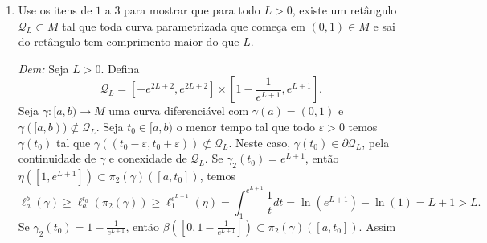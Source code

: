 \documentclass[twoside,openright,titlepage,numbers=noenddot,headinclude,  lineheaders footinclude=true,cleardoublepage=empty,BCOR=5mm,paper=a4,fontsize=12pt ]{scrbook}
\newcommand{\oo}{_}
\begin{document}
\begin{enumerate}
    
    \item Use os itens de $1$ a $3$ para mostrar que para todo $L>0$, existe um retângulo $\mathcal{Q}_L \subset M$ tal que toda curva parametrizada que começa em $(0,1) \in M$ e sai do retângulo tem comprimento maior do que $L$.    
    
    \noindent\textit{Dem:} Seja $L>0$. Defina
    \[
        \mathcal{Q} \oo L  = \left[-e^{2L+2}, e^{2L+2}\right]
        \times \left[1 - \dfrac{1}{e^{L+1}}, e^{L+1} \right].
    \]
    Seja $\gamma : [a,b) \rightarrow M$ uma curva diferenciável com $\gamma (a) = (0,1)$ e $\gamma([a,b))\not \subset \mathcal{Q}\oo L $.
    Seja $t \oo 0 \in [a,b)$ o menor tempo tal que todo $\varepsilon >0$ temos $\gamma (t \oo 0)$ tal que $\gamma ((t \oo 0  - \varepsilon , t \oo 0 +\varepsilon )) \not \subset \mathcal{Q}\oo L$.
    Neste caso, $\gamma (t\oo 0) \in \partial \mathcal{Q} \oo L$, pela continuidade de $\gamma$ e conexidade de $\mathcal{Q} \oo L$. 
    Se $\gamma \oo 2 (t \oo 0) = e^{L+1}$, então $ \eta ([1, e^{L+1}])\subset \pi \oo 2 (\gamma)([a, t \oo 0])$, temos
    \[
        \ell \oo a ^b (\gamma ) \geq \ell  \oo a ^{t \oo 0}(\pi\oo 2(\gamma))\geq \ell  \oo 1 ^{e^{L+1}} ( \eta ) = \int \oo 1 ^{e^{L+1}} \dfrac{1}{t}dt = \ln (e^{L+1}) - \ln (1) = L+1 >L.
    \]
    Se $\gamma \oo 2 (t \oo 0) = 1-\frac{1}{e^{L+1}}$, então $\beta   ([0, 1 - \frac{1}{e^{L+1}} ]) \subset \pi \oo 2 (\gamma) ([a, t\oo 0]) $. Assim
    

\end{enumerate}
\end{document}
